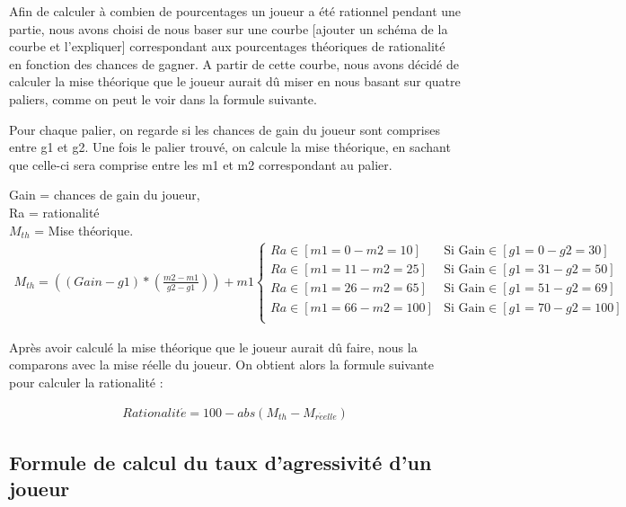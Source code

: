 \documentclass{report}
\begin{document}
\hspace{0.5cm}Afin de calculer à combien de pourcentages un joueur a été rationnel pendant une partie, nous avons choisi de nous baser sur une courbe [ajouter un schéma de la courbe et l'expliquer] correspondant aux pourcentages théoriques de rationalité en fonction des chances de gagner. A partir de cette courbe, nous avons décidé de calculer la mise théorique que le joueur aurait dû miser en nous basant sur quatre paliers, comme on peut le voir dans la formule suivante. \par
Pour chaque palier, on regarde si les chances de gain du joueur sont comprises entre g1 et g2. Une fois le palier trouvé, on calcule la mise théorique, en sachant que celle-ci sera comprise entre les m1 et m2 correspondant au palier. \par
	Gain = chances de gain du joueur,\\
	Ra = rationalité\\
	$M_{th}$ = Mise théorique.\\

\small{
\begin{align*}
	M_{th} = \left((Gain - g1) * \left(\frac{m2-m1}{g2-g1}\right)\right)+m1
	\begin{cases}
		Ra \in [m1=0 - m2=10] &\text{Si Gain} \in [g1=0 - g2=30]\\
		Ra \in [m1=11 - m2=25] &\text{Si Gain} \in [g1=31 - g2=50]\\
		Ra \in [m1=26 - m2=65] &\text{Si Gain} \in [g1=51 - g2=69]\\
		Ra \in [m1=66 - m2=100] &\text{Si Gain} \in [g1=70 - g2=100]\\
	\end{cases}
\end{align*}
}

Après avoir calculé la mise théorique que le joueur aurait dû faire, nous la comparons avec la mise réelle du joueur. On obtient alors la formule suivante pour calculer la rationalité : \par

\begin{align*}
Rationalit\acute{e} = 100-abs(M_{th}-M_{r\acute{e}elle})
\end{align*}

\subsection{Formule de calcul du taux d'agressivité d'un joueur}
\end{document}
